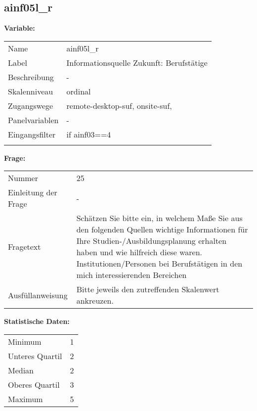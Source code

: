 	
	
	\subsection{ainf05l\_r}
	\label{subSection:ainf05l_r}

	\noindent\textbf{Variable:}\\
		\begin{tabular}{lL{11.3cm}}
			\label{tableVariable:ainf05l_r}
			Name & ainf05l\_r \\
			Label & Informationsquelle Zukunft: Berufstätige \\
			Beschreibung & - \\
			Skalenniveau & ordinal \\
			Zugangswege &
				remote-desktop-suf,
				onsite-suf,
 \\
			Panelvariablen & -
			 \\
			Eingangsfilter & if ainf03==4 \\
 \\
		\end{tabular}

		\vspace*{1 cm}
		\noindent\textbf{Frage:}\\
		\begin{tabular}{lL{11.3cm}}
			\label{tableQuestion:ainf05l_r}
			Nummer & 25 \\
			Einleitung der Frage & - \\
			Fragetext & Schätzen Sie bitte ein, in welchem Maße Sie aus den folgenden Quellen wichtige Informationen für Ihre Studien-/Ausbildungsplanung erhalten haben und wie hilfreich diese waren.
Institutionen/Personen
bei Berufstätigen in den mich interessierenden Bereichen \\
			Ausfüllanweisung & Bitte jeweils den zutreffenden Skalenwert ankreuzen. \\
		\end{tabular}


		\vspace*{1 cm}
		\noindent\textbf{Statistische Daten:}\\
			\begin{tabular}{ll}
				\label{tableStatistics:ainf05l_r}
					Minimum & 1 \\
					Unteres Quartil & 2 \\
					Median & 2 \\
					Oberes Quartil & 3 \\
					Maximum & 5 \\
			\end{tabular}



